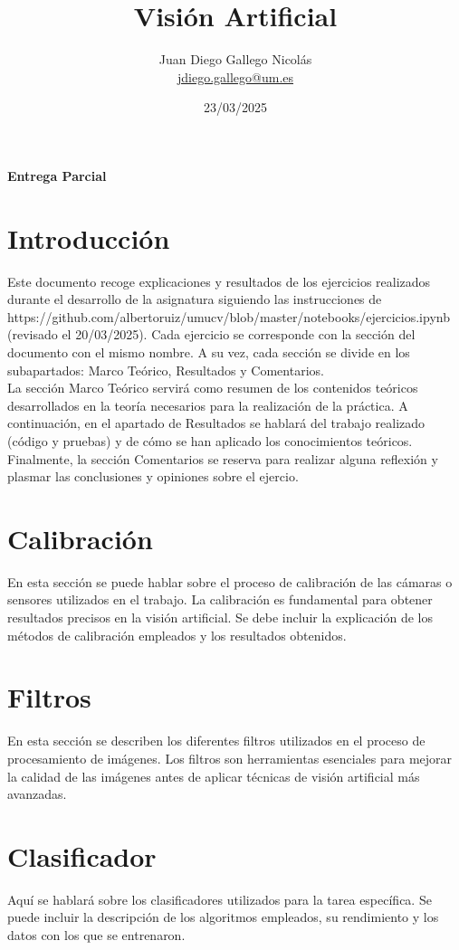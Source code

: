 \documentclass[12pt]{article}
\title{\Huge Visión Artificial}
\author{\Large Juan Diego Gallego Nicolás\\ \href{mailto:jdiego.gallego@um.es}{jdiego.gallego@um.es}}
\date{\Large 23/03/2025}
\begin{document}
\maketitle
\thispagestyle{empty}

\begin{center}
    \vspace{2cm}
    \textbf{Entrega Parcial}
\end{center}

\newpage

\tableofcontents
\newpage

\section{Introducción}
Este documento recoge explicaciones y resultados de los ejercicios realizados durante el desarrollo de la asignatura siguiendo las instrucciones de https://github.com/albertoruiz/umucv/blob/master/notebooks/ejercicios.ipynb (revisado el 20/03/2025).
Cada ejercicio se corresponde con la sección del documento con el mismo nombre.
A su vez, cada sección se divide en los subapartados: Marco Teórico, Resultados y Comentarios.\\
La sección Marco Teórico servirá como resumen de los contenidos teóricos desarrollados en la teoría necesarios para la realización de la práctica. 
A continuación, en el apartado de Resultados se hablará del trabajo realizado (código y pruebas) y de cómo se han aplicado los conocimientos teóricos.
Finalmente, la sección Comentarios se reserva para realizar alguna reflexión y plasmar las conclusiones y opiniones sobre el ejercio.

\newpage

\section{Calibración}
En esta sección se puede hablar sobre el proceso de calibración de las cámaras o sensores utilizados en el trabajo. La calibración es fundamental para obtener resultados precisos en la visión artificial. Se debe incluir la explicación de los métodos de calibración empleados y los resultados obtenidos.

\newpage

\section{Filtros}
En esta sección se describen los diferentes filtros utilizados en el proceso de procesamiento de imágenes. Los filtros son herramientas esenciales para mejorar la calidad de las imágenes antes de aplicar técnicas de visión artificial más avanzadas.

\newpage

\section{Clasificador}
Aquí se hablará sobre los clasificadores utilizados para la tarea específica. Se puede incluir la descripción de los algoritmos empleados, su rendimiento y los datos con los que se entrenaron.
\end{document}
